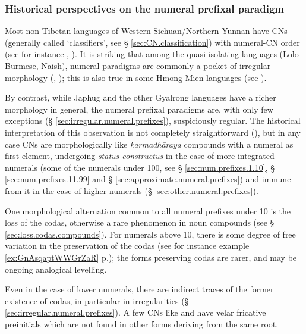 \subsubsection{Historical perspectives on the numeral prefixal paradigm} \label{sec:num.prefix.paradigm.history}
Most non-Tibetan languages of Western Sichuan/Northern Yunnan have CNs (generally called `classifiers', see § \ref{sec:CN.classification}) with numeral-CN order (see for instance \citealt{zhang14classifiers}, \citealt[163-194]{michaud17yongning}).  It is striking that among the quasi-isolating languages (Lolo-Burmese, Naish), numeral paradigms are commonly a pocket of irregular morphology (\citealt{bradley05numerals}, \citealt{michaud11cl}); this is also true in some Hmong-Mien  languages (see \citealt{gerner10classifier.isolating}).

By contrast, while Japhug and the other Gyalrong languages have a richer morphology in general, the numeral prefixal paradigms are, with only few exceptions (§ \ref{sec:irregular.numeral.prefixes}), suspiciously regular. The historical interpretation of this observation is not completely straightforward (\citealt{jacques17num}), but in any case CNs are morphologically like \textit{karmadhāraya} compounds with a numeral as first element, undergoing \textit{status constructus} in the case of more integrated numerals (some of the numerals under 100, see § \ref{sec:num.prefixes.1.10},  § \ref{sec:num.prefixes.11.99} and § \ref{sec:approximate.numeral.prefixes}) and immune from it in the case of higher numerals (§ \ref{sec:other.numeral.prefixes}).

One morphological alternation common to all numeral prefixes under 10 is the loss of the codas, otherwise a rare phenomenon in noun compounds (see § \ref{sec:loss.codas.compounds}). For numerals above 10, there is some degree of free variation in the preservation of the codas (see for instance example \ref{ex:GnAsqaptWWGrZaR} p.\pageref{ex:GnAsqaptWWGrZaR}); the forms preserving codas are rarer, and may be ongoing analogical levelling.

Even in the case of lower numerals, there are indirect traces of the former existence of codas, in particular in irregularities (§ \ref{sec:irregular.numeral.prefixes}). A few CNs like  and  have velar fricative preinitials  which are not found in other forms deriving from the same root. 

